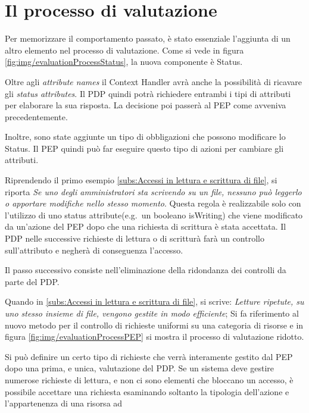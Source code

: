 \section{Il processo di valutazione}
\label{sec:Il processo di valutazione}
Per memorizzare il comportamento passato, è stato essenziale l'aggiunta di un altro elemento nel processo di valutazione.
Come si vede in figura \ref{fig:img/evaluationProcessStatus}, la nuova componente è Status.\par
{}
Oltre agli \emph{attribute names} il Context Handler avrà anche la possibilità di ricavare gli \emph{status attributes}.
Il \ac{PDP} quindi potrà richiedere entrambi i tipi di attributi per elaborare la sua risposta. La decisione poi passerà al PEP
come avveniva precedentemente.\par
Inoltre, sono state aggiunte un tipo di obbligazioni che possono modificare lo Status. Il \ac{PEP} quindi può far eseguire questo tipo di
azioni per cambiare gli attributi.\par
Riprendendo il primo esempio \ref{subs:Accessi in lettura e scrittura di file}, si riporta \emph{Se uno degli amministratori
sta scrivendo su un file, nessuno può leggerlo o apportare modifiche nello stesso momento}. Questa regola è realizzabile
solo con l'utilizzo di uno status attribute(e.g.\ un booleano isWriting) che viene modificato da un'azione del PEP dopo che
una richiesta di scrittura è stata accettata. Il \ac{PDP} nelle successive richieste di lettura o di scritturà farà un controllo
sull'attributo e negherà di conseguenza l'accesso.\par
{}
Il passo successivo consiste nell'eliminazione della ridondanza dei controlli da parte del \ac{PDP}.\par
Quando in \ref{subs:Accessi in lettura e scrittura di file}, si scrive:
\emph{Letture ripetute, su uno stesso insieme di file, vengono gestite in modo efficiente};
Si fa riferimento al nuovo metodo per il controllo di richieste uniformi su una categoria di risorse e
in figura \ref{fig:img/evaluationProcessPEP} si mostra il processo di valutazione ridotto.\par
Si può definire un certo tipo di richieste che verrà interamente gestito dal \ac{PEP} dopo una prima, e unica,
valutazione del \ac{PDP}. Se un sistema deve gestire numerose richieste di lettura, e non ci sono elementi che bloccano
un accesso, è possibile accettare una richiesta esaminando soltanto la tipologia dell'azione e l'appartenenza di una risorsa ad
